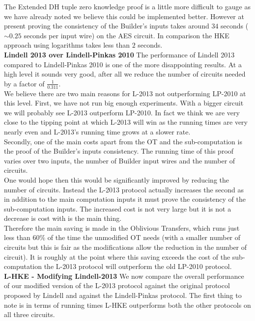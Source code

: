 \documentclass[ %
                    author={Nicholas Tutte},
                supervisor={Prof. Nigel Smart},
                    degree={MEng},
                     title={Secure Two Party Computation},
                  subtitle={A practical comparison of recent protocols},
                      type={Research - GG1K},
                      year={2015} ]{dissertation}
\begin{document}
					The Extended DH tuple zero knowledge proof is a little more difficult to gauge as we have already noted we believe this could be implemented better. However at present proving the consistency of the Builder's inputs takes around $34$ seconds ($\sim 0.25$ seconds per input wire) on the AES circuit. In comparison the HKE approach using logarithms takes less than $2$ seconds.\\

					\noindent \textbf{Lindell 2013 over Lindell-Pinkas 2010} The performance of Lindell 2013 compared to Lindell-Pinkas 2010 is one of the more disappointing results. At a high level it sounds very good, after all we reduce the number of circuits needed by a factor of $\frac{1}{0.311}$.\\

					We believe there are two main reasons for L-2013 not outperforming LP-2010 at this level. First, we have not run big enough experiments. With a bigger circuit we will probably see L-2013 outperform LP-2010. In fact we think we are very close to the tipping point at which L-2013 will win as the running times are very nearly even and L-2013's running time grows at a slower rate.\\

					Secondly, one of the main costs apart from the OT and the sub-computation is the proof of the Builder's inputs consistency. The running time of this proof varies over two inputs, the number of Builder input wires and the number of circuits.\\

					One would hope then this would be significantly improved by reducing the number of circuits.
					Instead the L-2013 protocol actually increases the second as in addition to the main computation inputs it must prove the consistency of the sub-computation inputs. The increased cost is not very large but it is not a decrease is cost with is the main thing.\\

					Therefore the main saving is made in the Oblivious Transfers, which runs just less than  $60\%$ of the time the unmodified OT needs (with a smaller number of circuits but this is fair as the modifications allow the reduction in the number of circuit). It is roughly at the point where this saving exceeds the cost of the sub-computation the L-2013 protocol will outperform the old LP-2010 protocol.\\

					\noindent \textbf{L-HKE - Modifying Lindell-2013} We now compare the overall performance of our modified version of the L-2013 protocol against the original protocol proposed by Lindell and against the Lindell-Pinkas protocol. The first thing to note is in terms of running times L-HKE outperforms both the other protocols on all three circuits.\\
\end{document}
